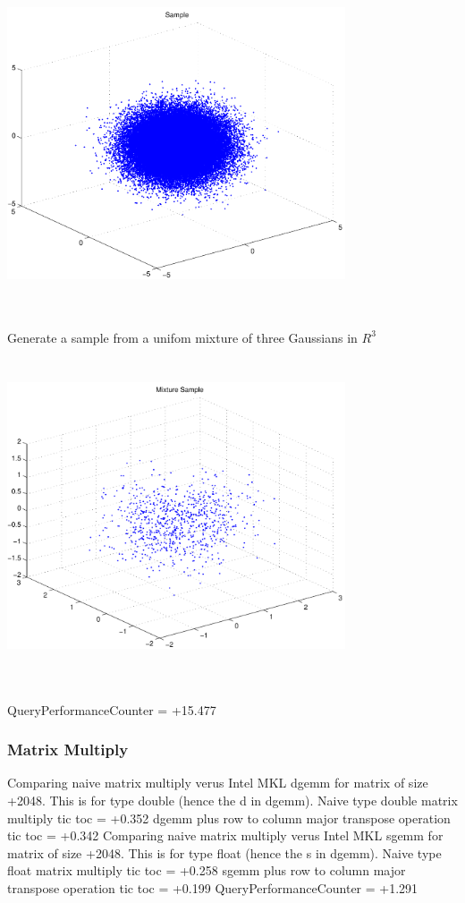 \documentclass[9pt]{article}
\theoremstyle{plain}
\theoremstyle{definition}
\theoremstyle{remark}
\numberwithin{equation}{section}
\begin{document}
\includegraphics[width=10.0cm,height=10.0cm]{R_3_Normal.pdf}

Generate a sample from a unifom mixture of three Gaussians in $R^3$
\includegraphics[width=10.0cm,height=10.0cm]{R_3_Normal_Mixture.pdf}

QueryPerformanceCounter  =  +15.477
\subsubsection{Matrix Multiply}
Comparing naive matrix multiply verus Intel MKL dgemm for matrix of size +2048.
This is for type double (hence the d in dgemm).
Naive type double matrix multiply tic toc  =  +0.352
dgemm plus row to column major transpose operation tic toc  =  +0.342
Comparing naive matrix multiply verus Intel MKL sgemm for matrix of size +2048.
This is for type float (hence the s in dgemm).
Naive type float matrix multiply tic toc  =  +0.258
sgemm plus row to column major transpose operation tic toc  =  +0.199
QueryPerformanceCounter  =  +1.291
\end{document}
